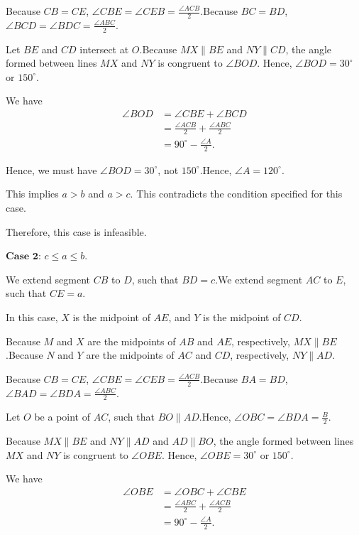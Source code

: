 \begin{enumerate}
 Because $CB = CE$, $\angle CBE =\angle CEB = \frac{\angle ACB}{2}$.Because $BC = BD$, $\angle BCD = \angle BDC = \frac{\angle ABC}{2}$.

 Let $BE$ and $CD$ intersect at $O$.Because $MX \parallel BE$ and $NY \parallel CD$, the angle formed between lines $MX$ and $NY$ is congruent to $\angle BOD$. Hence, $\angle BOD = 30^\circ$ or $150^\circ$.

 We have
 \begin{align*} \angle BOD & = \angle CBE + \angle BCD \\ & = \frac{\angle ACB}{2} + \frac{\angle ABC}{2} \\ & = 90^\circ - \frac{\angle A}{2} . \end{align*}


 Hence, we must have $\angle BOD = 30^\circ$, not $150^\circ$.Hence, $\angle A = 120^\circ$.

 This implies $a > b$ and $a >c$. This contradicts the condition specified for this case.

 Therefore, this case is infeasible.

 $\textbf{Case 2}$: $c \leq a \leq b$.

 We extend segment $CB$ to $D$, such that $BD = c$.We extend segment $AC$ to $E$, such that $CE = a$.

 In this case, $X$ is the midpoint of $AE$, and $Y$ is the midpoint of $CD$.

 Because $M$ and $X$ are the midpoints of $AB$ and $AE$, respectively, $MX \parallel BE$.Because $N$ and $Y$ are the midpoints of $AC$ and $CD$, respectively, $NY \parallel AD$.

 Because $CB = CE$, $\angle CBE =\angle CEB = \frac{\angle ACB}{2}$.Because $BA = BD$, $\angle BAD = \angle BDA = \frac{\angle ABC}{2}$.

 Let $O$ be a point of $AC$, such that $BO \parallel AD$.Hence, $\angle OBC = \angle BDA = \frac{B}{2}$.

 Because $MX \parallel BE$ and $NY \parallel AD$ and $AD \parallel BO$, the angle formed between lines $MX$ and $NY$ is congruent to $\angle OBE$. Hence, $\angle OBE = 30^\circ$ or $150^\circ$.

 We have
 \begin{align*} \angle OBE & = \angle OBC + \angle CBE \\ & = \frac{\angle ABC}{2} + \frac{\angle ACB}{2} \\ & = 90^\circ - \frac{\angle A}{2} . \end{align*}



\end{enumerate}
